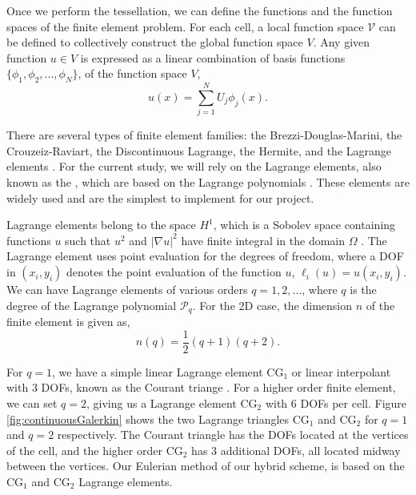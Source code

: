 Once we perform the tessellation, we can define the functions and the function spaces of the finite element problem. For each cell, a local function space $\mathcal{V}$ can be defined to collectively construct the global function space $V$. Any given function $u \in V$ is expressed as a linear combination of basis functions $\{\phi_1,\phi_2,...,\phi_N\}$,  of the function space $V$, 
	\begin{equation}
	u(x) = \sum_{j=1}^N U_j\phi_j(x).
	\end{equation}

There are several types of finite element families: the Brezzi-Douglas-Marini, the Crouzeiz-Raviart, the Discontinuous Lagrange, the Hermite, and the Lagrange elements \cite{Logg2012b}. For the current study, we will rely on the Lagrange elements, also known as the , which are based on the Lagrange polynomials \cite{Chen2011}. These elements are widely used and are the simplest to implement for our project. 


Lagrange elements belong to the space $H^1$, which is a Sobolev space containing functions $u$ such that $u^2$ and $\left|\nabla u\right|^2$ have finite integral in the domain $\Omega$ \cite{Logg2012b}. The Lagrange element uses point evaluation for the degrees of freedom, where a DOF in $(x_i,y_i)$ denotes the point evaluation of the function $u$, $\ell_i(u) = u(x_i,y_i)$. We can have Lagrange elements of various orders $q = 1, 2,...$, where $q$ is the degree of the Lagrange polynomial $\mathcal{P}_q$. For the 2D case, the dimension $n$ of the finite element is given as,
	\begin{equation}
	n(q) = \frac{1}{2}(q + 1)(q + 2).
	\end{equation}

For $q=1$, we have a simple linear Lagrange element $\mathrm{CG}_1$ or linear interpolant with $3$ DOFs, known as the Courant triange \cite{Courant1943}. For a higher order finite element, we can set $q=2$, giving us a Lagrange element $\mathrm{CG}_2$ with $6$ DOFs per cell. Figure \ref{fig:continuousGalerkin} shows the two Lagrange triangles $\mathrm{CG}_1$ and $\mathrm{CG}_2$ for $q = 1$ and $q=2$ respectively. The Courant triangle has the DOFs located at the vertices of the cell, and the higher order $\mathrm{CG}_2$ has $3$ additional DOFs, all located midway between the vertices. Our Eulerian method of our hybrid scheme, is based on the $\mathrm{CG}_1$ and $\mathrm{CG}_2$ Lagrange elements.

